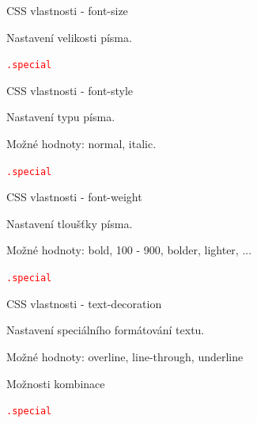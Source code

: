 \documentclass[aspectratio=169]{beamer}
\begin{document}
\begin{frame}{CSS vlastnosti - font-size}
    \begin{cardTiny}
        Nastavení velikosti písma.

        \begin{alltt}
            \textcolor{red}{.special} \string{\\
                \textcolor{blue}{font-size}: \textcolor{orange}{40px};\\
            \string}
        \end{alltt}
    \end{cardTiny}
\end{frame}

\begin{frame}{CSS vlastnosti - font-style}
    \begin{cardTiny}
        Nastavení typu písma.

        Možné hodnoty: normal, italic.

        \begin{alltt}
            \textcolor{red}{.special} \string{\\
                \textcolor{blue}{font-style}: \textcolor{orange}{italic};\\
            \string}
        \end{alltt}
    \end{cardTiny}
\end{frame}

\begin{frame}{CSS vlastnosti - font-weight}
    \begin{cardTiny}
        Nastavení tloušťky písma.

        Možné hodnoty: bold, 100 - 900, bolder, lighter, ...

        \begin{alltt}
            \textcolor{red}{.special} \string{\\
                \textcolor{blue}{font-weight}: \textcolor{orange}{bold};\\
            \string}
        \end{alltt}
    \end{cardTiny}
\end{frame}

\begin{frame}{CSS vlastnosti - text-decoration}
    \begin{cardTiny}
        Nastavení speciálního formátování textu.

        Možné hodnoty: overline, line-through, underline

        Možnosti kombinace

        \begin{alltt}
            \textcolor{red}{.special} \string{\\
                \textcolor{blue}{text-decoration}: \textcolor{orange}{overline underline};\\
            \string}
        \end{alltt}
    \end{cardTiny}
\end{frame}
\end{document}
